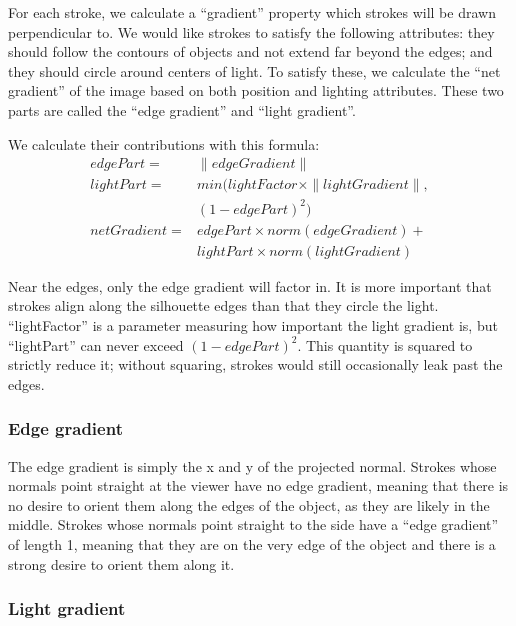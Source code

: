 \documentclass[conference]{acmsiggraph}
\begin{document}
For each stroke, we calculate a ``gradient'' property which strokes will be
drawn perpendicular to. We would like strokes to satisfy the following
attributes: they should follow the contours of objects and not extend far
beyond the edges; and they should circle around centers of light. To satisfy
these, we calculate the ``net gradient'' of the image based on both position
and lighting attributes. These two parts are called the ``edge gradient'' and
``light gradient''.

We calculate their contributions with this formula:
\begin{align*}
  edgePart = &\| edgeGradient \| \\
  lightPart = &min(lightFactor \times \| lightGradient \| , \\
              &(1 - edgePart)^2) \\
  netGradient = &edgePart \times norm(edgeGradient) +\\
                &lightPart \times norm(lightGradient)
\end{align*}

Near the edges, only the edge gradient will factor in. It is more important
that strokes align along the silhouette edges than that they circle the light.
``lightFactor'' is a parameter measuring how important the light gradient is,
but ``lightPart'' can never exceed $(1 - edgePart)^2$. This quantity is squared
to strictly reduce it; without squaring, strokes would still occasionally leak
past the edges.


\subsubsection{Edge gradient}

The edge gradient is simply the x and y of the projected normal. Strokes whose
normals point straight at the viewer have no edge gradient, meaning that there
is no desire to orient them along the edges of the object, as they are likely
in the middle. Strokes whose normals point straight to the side have a
``edge gradient'' of length 1, meaning that they are on the very edge of the
object and there is a strong desire to orient them along it.


\subsubsection{Light gradient}
\end{document}
